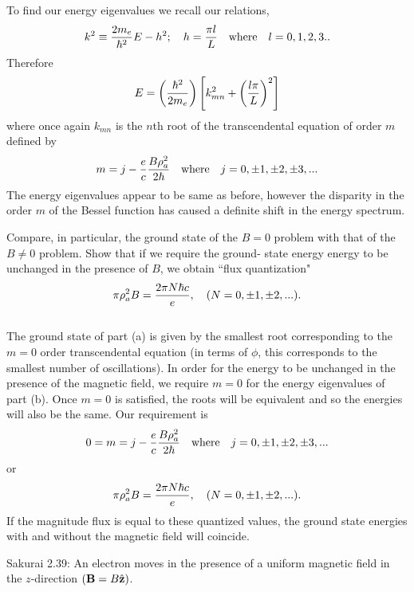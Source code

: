 \documentclass[11pt,letterpaper]{article}
\begin{document}
		To find our energy eigenvalues we recall our relations,
		\[
			k^2 \equiv \frac{2m_e}{\hbar^2}E-h^2;\quad h = \frac{\pi l}{L}\quad\text{where}\quad l=0,1,2,3..
		\]
		Therefore
		\[
                		E = \left(\frac{\hbar^2}{2m_e}\right)\left[k_{mn}^2+\left(\frac{l\pi}{L}\right)^2\right]
		\]
		where once again $k_{mn}$ is the $n$th root of the transcendental equation of order $m$ defined by
		\[
			m = j-\frac{e}{c}\frac{B\rho_a^2}{2\hbar}\quad \text{where}\quad j = 0,\pm1,\pm2,\pm3,...
		\]
		The energy eigenvalues appear to be same as before, however the disparity in the order $m$ of the Bessel function has caused a 
		definite shift in the energy spectrum. 
		\\
                \item
                Compare, in particular, the ground state of the $B=0$ problem with that of the $B\ne 0$ problem. Show that if we require the ground-
                state energy energy to be unchanged in the presence of $B$, we obtain ``flux quantization" 
                \[
                		\pi\rho_a^2B = \frac{2\pi N\hbar c}{e},\quad (N = 0,\pm 1,\pm 2,...).
		\]
		\\
		The ground state of part (a) is given by the smallest root corresponding to the $m=0$ order transcendental equation (in terms of $
		\phi$, this corresponds to the smallest number of oscillations). In order for the energy to be unchanged in the presence of the 
		magnetic field, we require $m=0$ for the energy eigenvalues of part (b). Once $m=0$ is satisfied, the roots will be equivalent and 			so the energies will also be the same. Our requirement is
		\[
			0=m = j-\frac{e}{c}\frac{B\rho_a^2}{2\hbar}\quad \text{where}\quad j = 0,\pm1,\pm2,\pm3,...
		\]
		or
		\[
			\pi\rho_a^2B = \frac{2\pi N\hbar c}{e},\quad (N = 0,\pm 1,\pm 2,...).
		\]
		If the magnitude flux is equal to these quantized values, the ground state energies with and without the magnetic field will coincide. 
		
	\eenum
	\item
	Sakurai 2.39: An electron moves in the presence of a uniform magnetic field in the $z$-direction $(\mathbf{B} = B\hat{\mathbf{z}})$.
	
\end{document}
